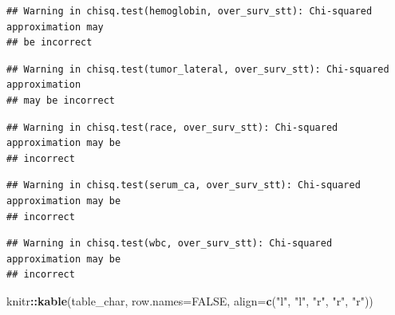 \documentclass[]{article}
\newenvironment{Shaded}{\begin{snugshade}}{\end{snugshade}}
\newcommand{\KeywordTok}[1]{\textcolor[rgb]{0.13,0.29,0.53}{\textbf{#1}}}
\newcommand{\DataTypeTok}[1]{\textcolor[rgb]{0.13,0.29,0.53}{#1}}
\newcommand{\StringTok}[1]{\textcolor[rgb]{0.31,0.60,0.02}{#1}}
\newcommand{\OtherTok}[1]{\textcolor[rgb]{0.56,0.35,0.01}{#1}}
\newcommand{\OperatorTok}[1]{\textcolor[rgb]{0.81,0.36,0.00}{\textbf{#1}}}
\newcommand{\NormalTok}[1]{#1}
\begin{document}
\begin{verbatim}
## Warning in chisq.test(hemoglobin, over_surv_stt): Chi-squared approximation may
## be incorrect
\end{verbatim}

\begin{verbatim}
## Warning in chisq.test(tumor_lateral, over_surv_stt): Chi-squared approximation
## may be incorrect
\end{verbatim}

\begin{verbatim}
## Warning in chisq.test(race, over_surv_stt): Chi-squared approximation may be
## incorrect
\end{verbatim}

\begin{verbatim}
## Warning in chisq.test(serum_ca, over_surv_stt): Chi-squared approximation may be
## incorrect
\end{verbatim}

\begin{verbatim}
## Warning in chisq.test(wbc, over_surv_stt): Chi-squared approximation may be
## incorrect
\end{verbatim}

\begin{Shaded}
\begin{Highlighting}[]
\NormalTok{knitr}\OperatorTok{::}\KeywordTok{kable}\NormalTok{(table_char, }\DataTypeTok{row.names=}\OtherTok{FALSE}\NormalTok{, }\DataTypeTok{align=}\KeywordTok{c}\NormalTok{(}\StringTok{"l"}\NormalTok{, }\StringTok{"l"}\NormalTok{, }\StringTok{"r"}\NormalTok{, }\StringTok{"r"}\NormalTok{, }\StringTok{"r"}\NormalTok{))}
\end{Highlighting}
\end{Shaded}
\end{document}
